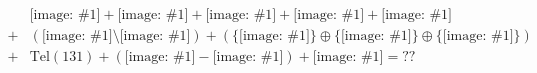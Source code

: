 \documentclass[12pt]{article}
\newcommand{\pic}[1]{\mathord{\texttt{[image: \#1]}}}
\begin{document}
\thispagestyle{empty}
\begin{equation*}
  \begin{split}
    &\pic{"ad"} + \pic{"serg"} + \pic{"bem"} + \pic{"min"} + \pic{"iss"}\\
    +& %
    ( \pic{"E24"} \setminus \pic{"rsm"} )
    + ( \{\pic{"cws"}\} \oplus \{\pic{"as"}\} \oplus \{\pic{"caw"}\} )\\
    +& %
    \textrm{Tel}(131)
    +( \pic{"thol"} - \pic{"olid"} ) + \pic{"eliz"} = ??
\end{split}
\end{equation*}
\end{document}
